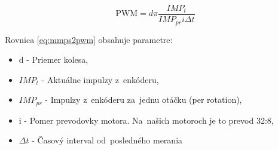 \begin{equation}
	\text{PWM} = d \pi \frac{IMP_t}{IMP_{pr} i \Delta t}
	\label{eq:mmps2pwm}
\end{equation}

Rovnica \ref{eq:mmps2pwm} obsahuje parametre:
\begin{itemize}
	\item d - Priemer kolesa,
	\item $IMP_t$ - Aktuálne impulzy z~enkóderu,
	\item $IMP_{pr}$ - Impulzy z~enkóderu za~jednu otáčku (per rotation),
	\item i - Pomer prevodovky motora. Na~našich motoroch je to prevod 32:8,
	\item $\Delta t$ - Časový interval od~posledného merania
\end{itemize}

